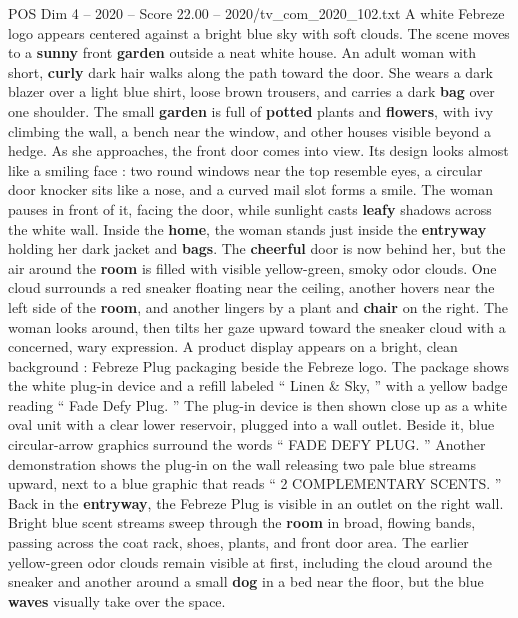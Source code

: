 \begin{textsample}{POS Dim 4 – 2020 – Score 22.00 – 2020/tv\_com\_2020\_102.txt}  \label{ex:f4_pos_004}
A white Febreze logo appears centered against a bright blue sky with soft clouds.
The scene moves to a \textbf{sunny} front \textbf{garden} outside a neat white house.
An adult woman with short, \textbf{curly} dark hair walks along the path toward the door.
She wears a dark blazer over a light blue shirt, loose brown trousers, and carries a dark \textbf{bag} over one shoulder.
The small \textbf{garden} is full of \textbf{potted} plants and \textbf{flowers}, with ivy climbing the wall, a bench near the window, and other houses visible beyond a hedge.
As she approaches, the front door comes into view.
Its design looks almost like a smiling face : two round windows near the top resemble eyes, a circular door knocker sits like a nose, and a curved mail slot forms a smile.
The woman pauses in front of it, facing the door, while sunlight casts \textbf{leafy} shadows across the white wall.
Inside the \textbf{home}, the woman stands just inside the \textbf{entryway} holding her dark jacket and \textbf{bags}.
The \textbf{cheerful} door is now behind her, but the air around the \textbf{room} is filled with visible yellow-green, smoky odor clouds.
One cloud surrounds a red sneaker floating near the ceiling, another hovers near the left side of the \textbf{room}, and another lingers by a plant and \textbf{chair} on the right.
The woman looks around, then tilts her gaze upward toward the sneaker cloud with a concerned, wary expression.
A product display appears on a bright, clean background : Febreze Plug packaging beside the Febreze logo.
The package shows the white plug-in device and a refill labeled “ Linen \& Sky, ” with a yellow badge reading “ Fade Defy Plug. ” The plug-in device is then shown close up as a white oval unit with a clear lower reservoir, plugged into a wall outlet.
Beside it, blue circular-arrow graphics surround the words “ FADE DEFY PLUG. ” Another demonstration shows the plug-in on the wall releasing two pale blue streams upward, next to a blue graphic that reads “ 2 COMPLEMENTARY SCENTS. ” Back in the \textbf{entryway}, the Febreze Plug is visible in an outlet on the right wall.
Bright blue scent streams sweep through the \textbf{room} in broad, flowing bands, passing across the coat rack, shoes, plants, and front door area.
The earlier yellow-green odor clouds remain visible at first, including the cloud around the sneaker and another around a small \textbf{dog} in a bed near the floor, but the blue \textbf{waves} visually take over the space.

\end{textsample}
